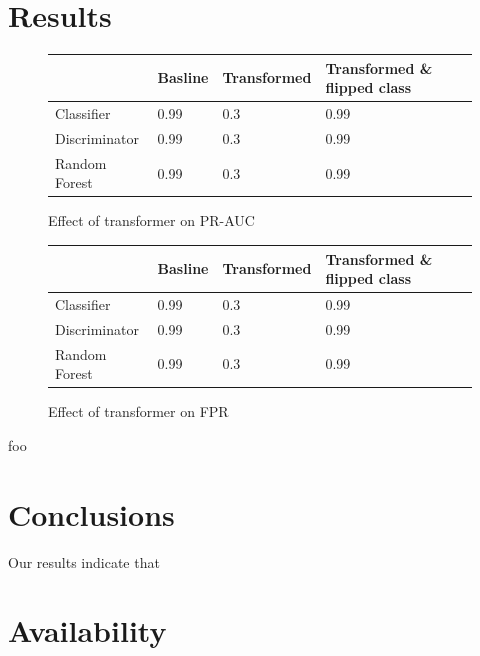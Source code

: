 \section{Results}
\begin{figure}
    \begin{center}
        \begin{tabularx}{0.5\textwidth}{ |X|X|X|X| }
          \hline
            & Basline & Transformed & Transformed \& flipped class \\
          \hline 
          Classifier  & 0.99  & 0.3  & 0.99  \\
          \hline 
          Discriminator & 0.99  & 0.3  & 0.99  \\
          \hline
          Random Forest & 0.99  & 0.3  & 0.99  \\
          \hline
        \end{tabularx}
    \end{center}
    \caption{\label{fig:results-pr-auc} Effect of transformer on PR-AUC} 
\end{figure}
\begin{figure}
    \begin{center}
        \begin{tabularx}{0.5\textwidth}{ |X|X|X|X| }
          \hline
            & Basline & Transformed & Transformed \& flipped class \\
          \hline 
          Classifier  & 0.99  & 0.3  & 0.99  \\
          \hline 
          Discriminator & 0.99  & 0.3  & 0.99  \\
          \hline
          Random Forest & 0.99  & 0.3  & 0.99  \\
          \hline
        \end{tabularx}
    \end{center}
    \caption{\label{fig:results-fpr} Effect of transformer on FPR} 
\end{figure}
foo
\section{Conclusions}
Our results indicate that 
\section{Availability}

